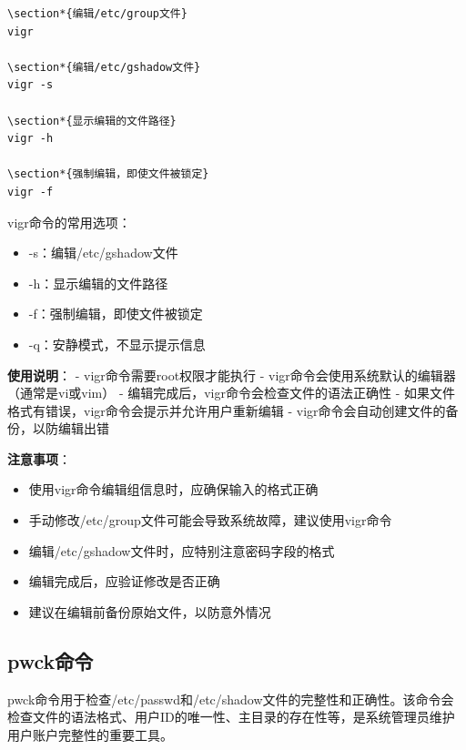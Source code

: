 \documentclass[12pt,UTF8]{ctexbook}
\begin{document}
\begin{verbatim}
\section*{编辑/etc/group文件}
vigr

\section*{编辑/etc/gshadow文件}
vigr -s

\section*{显示编辑的文件路径}
vigr -h

\section*{强制编辑，即使文件被锁定}
vigr -f
\end{verbatim}

vigr命令的常用选项：
\begin{itemize}
    \item -s：编辑/etc/gshadow文件
    \item -h：显示编辑的文件路径
    \item -f：强制编辑，即使文件被锁定
    \item -q：安静模式，不显示提示信息
\end{itemize}

\textbf{使用说明}：
- vigr命令需要root权限才能执行
- vigr命令会使用系统默认的编辑器（通常是vi或vim）
- 编辑完成后，vigr命令会检查文件的语法正确性
- 如果文件格式有错误，vigr命令会提示并允许用户重新编辑
- vigr命令会自动创建文件的备份，以防编辑出错

\textbf{注意事项}：
\begin{itemize}
    \item 使用vigr命令编辑组信息时，应确保输入的格式正确
    \item 手动修改/etc/group文件可能会导致系统故障，建议使用vigr命令
    \item 编辑/etc/gshadow文件时，应特别注意密码字段的格式
    \item 编辑完成后，应验证修改是否正确
    \item 建议在编辑前备份原始文件，以防意外情况
\end{itemize}

\subsection{pwck命令}
pwck命令用于检查/etc/passwd和/etc/shadow文件的完整性和正确性。该命令会检查文件的语法格式、用户ID的唯一性、主目录的存在性等，是系统管理员维护用户账户完整性的重要工具。
\end{document}
